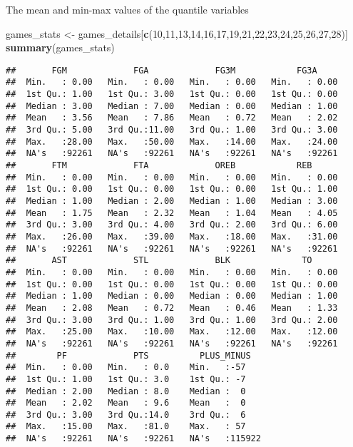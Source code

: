 \documentclass[
]{article}
\newenvironment{Shaded}{\begin{snugshade}}{\end{snugshade}}
\newcommand{\DecValTok}[1]{\textcolor[rgb]{0.00,0.00,0.81}{#1}}
\newcommand{\KeywordTok}[1]{\textcolor[rgb]{0.13,0.29,0.53}{\textbf{#1}}}
\newcommand{\NormalTok}[1]{#1}
\newcommand{\StringTok}[1]{\textcolor[rgb]{0.31,0.60,0.02}{#1}}
\begin{document}
The mean and min-max values of the quantile variables

\begin{Shaded}
\begin{Highlighting}[]
\NormalTok{games\_stats \textless{}{-}}\StringTok{ }\NormalTok{games\_details[}\KeywordTok{c}\NormalTok{(}\DecValTok{10}\NormalTok{,}\DecValTok{11}\NormalTok{,}\DecValTok{13}\NormalTok{,}\DecValTok{14}\NormalTok{,}\DecValTok{16}\NormalTok{,}\DecValTok{17}\NormalTok{,}\DecValTok{19}\NormalTok{,}\DecValTok{21}\NormalTok{,}\DecValTok{22}\NormalTok{,}\DecValTok{23}\NormalTok{,}\DecValTok{24}\NormalTok{,}\DecValTok{25}\NormalTok{,}\DecValTok{26}\NormalTok{,}\DecValTok{27}\NormalTok{,}\DecValTok{28}\NormalTok{)]}
\KeywordTok{summary}\NormalTok{(games\_stats)}
\end{Highlighting}
\end{Shaded}

\begin{verbatim}
##       FGM             FGA             FG3M            FG3A      
##  Min.   : 0.00   Min.   : 0.00   Min.   : 0.00   Min.   : 0.00  
##  1st Qu.: 1.00   1st Qu.: 3.00   1st Qu.: 0.00   1st Qu.: 0.00  
##  Median : 3.00   Median : 7.00   Median : 0.00   Median : 1.00  
##  Mean   : 3.56   Mean   : 7.86   Mean   : 0.72   Mean   : 2.02  
##  3rd Qu.: 5.00   3rd Qu.:11.00   3rd Qu.: 1.00   3rd Qu.: 3.00  
##  Max.   :28.00   Max.   :50.00   Max.   :14.00   Max.   :24.00  
##  NA's   :92261   NA's   :92261   NA's   :92261   NA's   :92261  
##       FTM             FTA             OREB            REB       
##  Min.   : 0.00   Min.   : 0.00   Min.   : 0.00   Min.   : 0.00  
##  1st Qu.: 0.00   1st Qu.: 0.00   1st Qu.: 0.00   1st Qu.: 1.00  
##  Median : 1.00   Median : 2.00   Median : 1.00   Median : 3.00  
##  Mean   : 1.75   Mean   : 2.32   Mean   : 1.04   Mean   : 4.05  
##  3rd Qu.: 3.00   3rd Qu.: 4.00   3rd Qu.: 2.00   3rd Qu.: 6.00  
##  Max.   :26.00   Max.   :39.00   Max.   :18.00   Max.   :31.00  
##  NA's   :92261   NA's   :92261   NA's   :92261   NA's   :92261  
##       AST             STL             BLK              TO       
##  Min.   : 0.00   Min.   : 0.00   Min.   : 0.00   Min.   : 0.00  
##  1st Qu.: 0.00   1st Qu.: 0.00   1st Qu.: 0.00   1st Qu.: 0.00  
##  Median : 1.00   Median : 0.00   Median : 0.00   Median : 1.00  
##  Mean   : 2.08   Mean   : 0.72   Mean   : 0.46   Mean   : 1.33  
##  3rd Qu.: 3.00   3rd Qu.: 1.00   3rd Qu.: 1.00   3rd Qu.: 2.00  
##  Max.   :25.00   Max.   :10.00   Max.   :12.00   Max.   :12.00  
##  NA's   :92261   NA's   :92261   NA's   :92261   NA's   :92261  
##        PF             PTS          PLUS_MINUS    
##  Min.   : 0.00   Min.   : 0.0    Min.   :-57     
##  1st Qu.: 1.00   1st Qu.: 3.0    1st Qu.: -7     
##  Median : 2.00   Median : 8.0    Median :  0     
##  Mean   : 2.02   Mean   : 9.6    Mean   :  0     
##  3rd Qu.: 3.00   3rd Qu.:14.0    3rd Qu.:  6     
##  Max.   :15.00   Max.   :81.0    Max.   : 57     
##  NA's   :92261   NA's   :92261   NA's   :115922
\end{verbatim}
\end{document}
